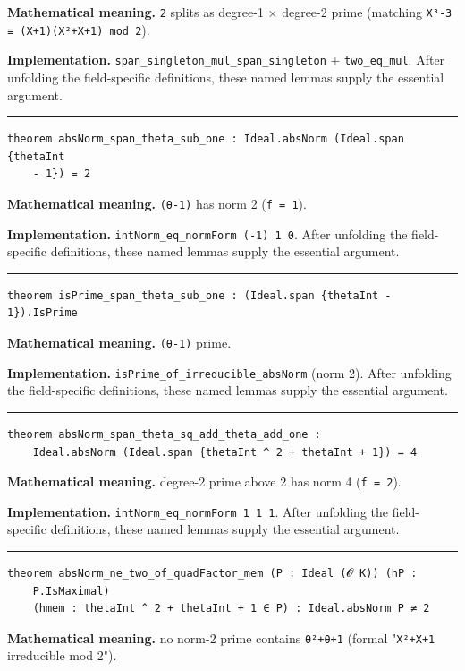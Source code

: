 \documentclass[UTF8,a4paper,11pt,fontset=fandol]{ctexart}
\theoremstyle{definition}
\newcommand{\statementsep}{\par\medskip\hrule\medskip}
\begin{document}
\noindent\textbf{Mathematical meaning.} \texttt{2} splits as degree-1 × degree-2 prime (matching \texttt{X³-3 ≡ (X+1)(X²+X+1) mod 2}).\par
\noindent\textbf{Implementation.} \texttt{span\_\allowbreak{}singleton\_\allowbreak{}mul\_\allowbreak{}span\_\allowbreak{}singleton} + \texttt{two\_\allowbreak{}eq\_\allowbreak{}mul}. After unfolding the field-specific definitions, these named lemmas supply the essential argument.\par
\statementsep
\begin{verbatim}
theorem absNorm_span_theta_sub_one : Ideal.absNorm (Ideal.span {thetaInt
    - 1}) = 2
\end{verbatim}
\noindent\textbf{Mathematical meaning.} \texttt{(θ-1)} has norm 2 (\texttt{f = 1}).\par
\noindent\textbf{Implementation.} \texttt{intNorm\_\allowbreak{}eq\_\allowbreak{}normForm (-1) 1 0}. After unfolding the field-specific definitions, these named lemmas supply the essential argument.\par
\statementsep
\begin{verbatim}
theorem isPrime_span_theta_sub_one : (Ideal.span {thetaInt - 1}).IsPrime
\end{verbatim}
\noindent\textbf{Mathematical meaning.} \texttt{(θ-1)} prime.\par
\noindent\textbf{Implementation.} \texttt{isPrime\_\allowbreak{}of\_\allowbreak{}irreducible\_\allowbreak{}absNorm} (norm 2). After unfolding the field-specific definitions, these named lemmas supply the essential argument.\par
\statementsep
\begin{verbatim}
theorem absNorm_span_theta_sq_add_theta_add_one :
    Ideal.absNorm (Ideal.span {thetaInt ^ 2 + thetaInt + 1}) = 4
\end{verbatim}
\noindent\textbf{Mathematical meaning.} degree-2 prime above 2 has norm 4 (\texttt{f = 2}).\par
\noindent\textbf{Implementation.} \texttt{intNorm\_\allowbreak{}eq\_\allowbreak{}normForm 1 1 1}. After unfolding the field-specific definitions, these named lemmas supply the essential argument.\par
\statementsep
\begin{verbatim}
theorem absNorm_ne_two_of_quadFactor_mem (P : Ideal (𝓞 K)) (hP :
    P.IsMaximal)
    (hmem : thetaInt ^ 2 + thetaInt + 1 ∈ P) : Ideal.absNorm P ≠ 2
\end{verbatim}
\noindent\textbf{Mathematical meaning.} no norm-2 prime contains \texttt{θ²+θ+1} (formal "\texttt{X²+X+1} irreducible mod 2").\par
\end{document}
